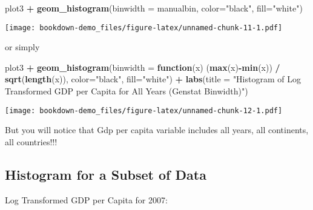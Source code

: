 \documentclass[
]{book}
\newenvironment{Shaded}{\begin{snugshade}}{\end{snugshade}}
\newcommand{\ControlFlowTok}[1]{\textcolor[rgb]{0.13,0.29,0.53}{\textbf{#1}}}
\newcommand{\DataTypeTok}[1]{\textcolor[rgb]{0.13,0.29,0.53}{#1}}
\newcommand{\KeywordTok}[1]{\textcolor[rgb]{0.13,0.29,0.53}{\textbf{#1}}}
\newcommand{\NormalTok}[1]{#1}
\newcommand{\OperatorTok}[1]{\textcolor[rgb]{0.81,0.36,0.00}{\textbf{#1}}}
\newcommand{\StringTok}[1]{\textcolor[rgb]{0.31,0.60,0.02}{#1}}
\begin{document}
\pagebreak

\begin{Shaded}
\begin{Highlighting}[]
\NormalTok{plot3 }\OperatorTok{+}\StringTok{ }
\StringTok{  }\KeywordTok{geom_histogram}\NormalTok{(}\DataTypeTok{binwidth =}\NormalTok{ manualbin, }\DataTypeTok{color=}\StringTok{"black"}\NormalTok{, }\DataTypeTok{fill=}\StringTok{"white"}\NormalTok{) }
\end{Highlighting}
\end{Shaded}

\texttt{[image: bookdown-demo\_files/figure-latex/unnamed-chunk-11-1.pdf]}

\pagebreak

or simply

\begin{Shaded}
\begin{Highlighting}[]
\NormalTok{plot3 }\OperatorTok{+}\StringTok{ }
\StringTok{  }\KeywordTok{geom_histogram}\NormalTok{(}\DataTypeTok{binwidth =} \ControlFlowTok{function}\NormalTok{(x) (}\KeywordTok{max}\NormalTok{(x)}\OperatorTok{-}\KeywordTok{min}\NormalTok{(x)) }\OperatorTok{/}\StringTok{ }\KeywordTok{sqrt}\NormalTok{(}\KeywordTok{length}\NormalTok{(x)), }\DataTypeTok{color=}\StringTok{"black"}\NormalTok{, }\DataTypeTok{fill=}\StringTok{"white"}\NormalTok{) }\OperatorTok{+}
\StringTok{    }\KeywordTok{labs}\NormalTok{(}\DataTypeTok{title =} \StringTok{"Histogram of  Log Transformed GDP per Capita for All Years (Genstat Binwidth)"}\NormalTok{)}
\end{Highlighting}
\end{Shaded}

\texttt{[image: bookdown-demo\_files/figure-latex/unnamed-chunk-12-1.pdf]}

But you will notice that Gdp per capita variable includes all years, all continents, all countries!!!

\pagebreak

\hypertarget{histogram-for-a-subset-of-data}{%
\subsection{Histogram for a Subset of Data}\label{histogram-for-a-subset-of-data}}

Log Transformed GDP per Capita for 2007:
\end{document}
